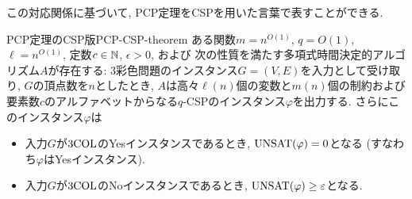 この対応関係に基づいて, PCP定理をCSPを用いた言葉で表すことができる.

\begin{theorem}{PCP定理のCSP版}{PCP-CSP-theorem}
  ある関数$m=n^{O(1)}$, $q=O(1)$, $\ell=n^{O(1)}$, 定数$c\in\mathbb{N}$, $\epsilon>0$, および
  次の性質を満たす多項式時間決定的アルゴリズム$A$が存在する:
  3彩色問題のインスタンス$G=(V,E)$を入力として受け取り, $G$の頂点数を$n$としたとき, $A$は高々$\ell(n)$個の変数と$m(n)$個の制約および要素数$c$のアルファベットからなる$q$-CSPのインスタンス$\varphi$を出力する.
  さらにこのインスタンス$\varphi$は
  \begin{itemize}
  \item 入力$G$が$\mathrm{3COL}$のYesインスタンスであるとき, $\mathrm{UNSAT}(\varphi) = 0$となる (すなわち$\varphi$はYesインスタンス).
  \item 入力$G$が$\mathrm{3COL}$のNoインスタンスであるとき, $\mathrm{UNSAT}(\varphi) \ge \varepsilon$となる.
  \end{itemize}
\end{theorem}

